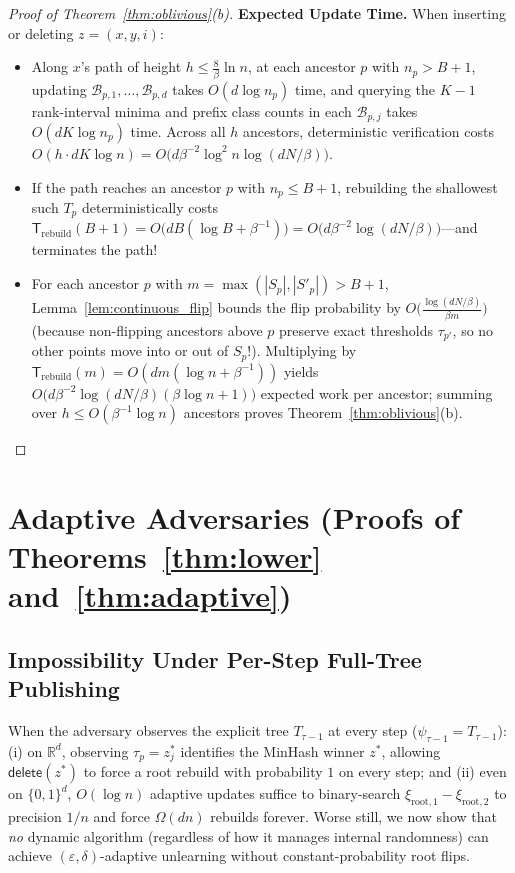 \documentclass[11pt]{article}
\theoremstyle{definition}
\newcommand{\R}{\mathbb{R}}
\newcommand{\calB}{\mathcal{B}}
\begin{document}
\begin{proof}[Proof of Theorem~\ref{thm:oblivious}(b)]
\textbf{Expected Update Time.}
When inserting or deleting $z = (x, y, i)$:
\begin{itemize}[leftmargin=1.5em,itemsep=2pt]
    \item Along $x$'s path of height $h \le \frac{8}{\beta}\ln n$, at each ancestor $p$ with $n_p > B + 1$, updating $\calB_{p, 1}, \dots, \calB_{p, d}$ takes $O(d \log n_p)$ time, and querying the $K - 1$ rank-interval minima and prefix class counts in each $\calB_{p, j}$ takes $O(d K \log n_p)$ time. Across all $h$ ancestors, deterministic verification costs $O(h \cdot d K \log n) = O\big(d \beta^{-2} \log^2 n \log(dN/\beta)\big)$.
    \item If the path reaches an ancestor $p$ with $n_p \le B + 1$, rebuilding the shallowest such $T_p$ deterministically costs $\mathsf{T}_{\mathrm{rebuild}}(B+1) = O\big(d B (\log B + \beta^{-1})\big) = O\big(d \beta^{-2} \log(dN/\beta)\big)$---and terminates the path!
    \item For each ancestor $p$ with $m = \max(|S_p|, |S'_p|) > B + 1$, Lemma~\ref{lem:continuous_flip} bounds the flip probability by $O\big(\frac{\log(dN/\beta)}{\beta m}\big)$ (because non-flipping ancestors above $p$ preserve exact thresholds $\tau_{p'}$, so no other points move into or out of $S_p$!). Multiplying by $\mathsf{T}_{\mathrm{rebuild}}(m) = O(d m (\log n + \beta^{-1}))$ yields $O\big(d \beta^{-2}\log(dN/\beta)(\beta\log n + 1)\big)$ expected work per ancestor; summing over $h \le O(\beta^{-1}\log n)$ ancestors proves Theorem~\ref{thm:oblivious}(b).
\end{itemize}
\end{proof}

\section{Adaptive Adversaries (Proofs of Theorems~\ref{thm:lower} and~\ref{thm:adaptive})}

\subsection{Impossibility Under Per-Step Full-Tree Publishing}

When the adversary observes the explicit tree $T_{\tau-1}$ at every step ($\psi_{\tau-1} = T_{\tau-1}$): (i) on $\R^d$, observing $\tau_p = z^*_j$ identifies the MinHash winner $z^*$, allowing $\mathsf{delete}(z^*)$ to force a root rebuild with probability $1$ on every step; and (ii) even on $\{0,1\}^d$, $O(\log n)$ adaptive updates suffice to binary-search $\xi_{\text{root}, 1} - \xi_{\text{root}, 2}$ to precision $1/n$ and force $\Omega(dn)$ rebuilds forever. Worse still, we now show that \emph{no} dynamic algorithm (regardless of how it manages internal randomness) can achieve $(\varepsilon, \delta)$-adaptive unlearning without constant-probability root flips.
\end{document}
